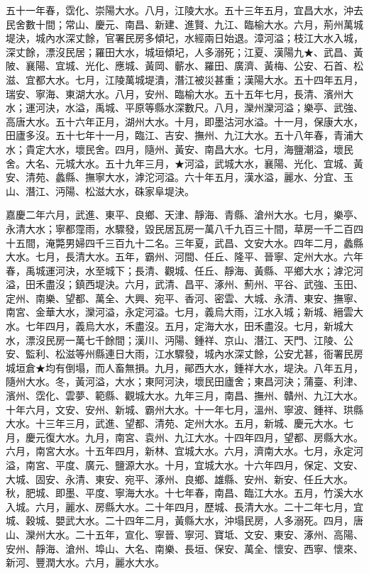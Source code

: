\begin{pinyinscope}
五十一年春，霑化、崇陽大水。八月，江陵大水。五十三年五月，宜昌大水，沖去民舍數十間；常山、慶元、南昌、新建、進賢、九江、臨榆大水。六月，荊州萬城堤決，城內水深丈餘，官署民房多傾圮，水經兩日始退。漳河溢；枝江大水入城，深丈餘，漂沒民居；羅田大水，城垣傾圮，人多溺死；江夏、漢陽九★、武昌、黃陂、襄陽、宜城、光化、應城、黃岡、蘄水、羅田、廣濟、黃梅、公安、石首、松滋、宜都大水。七月，江陵萬城堤潰，潛江被災甚重；漢陽大水。五十四年五月，瑞安、寧海、東湖大水。八月，安州、臨榆大水。五十五年七月，長清、濱州大水；運河決，水溢，禹城、平原等縣水深數尺。八月，灤州灤河溢；樂亭、武強、高唐大水。五十六年正月，湖州大水。十月，即墨沽河水溢。十一月，保康大水，田廬多沒。五十七年十一月，臨江、吉安、撫州、九江大水。五十八年春，青浦大水；貴定大水，壞民舍。四月，隨州、黃安、南昌大水。七月，海鹽潮溢，壞民舍。大名、元城大水。五十九年三月，★河溢，武城大水，襄陽、光化、宜城、黃安、清苑、蠡縣、撫寧大水，滹沱河溢。六十年五月，漢水溢，麗水、分宜、玉山、潛江、沔陽、松滋大水，硃家阜堤決。

嘉慶二年六月，武進、東平、良鄉、天津、靜海、青縣、滄州大水。七月，樂亭、永清大水；寧都霪雨，水驟發，毀民居瓦房一萬八千九百三十間，草房一千二百四十五間，淹斃男婦四千三百九十二名。三年夏，武昌、文安大水。四年二月，蠡縣大水。七月，長清大水。五年，霸州、河間、任丘、隆平、晉寧、定州大水。六年春，禹城運河決，水至城下；長清、觀城、任丘、靜海、黃縣、平鄉大水；滹沱河溢，田禾盡沒；鎮西堤決。六月，武清、昌平、涿州、薊州、平谷、武強、玉田、定州、南樂、望都、萬全、大興、宛平、香河、密雲、大城、永清、東安、撫寧、南宮、金華大水，灤河溢，永定河溢。七月，義烏大雨，江水入城；新城、縉雲大水。七年四月，義烏大水，禾盡沒。五月，定海大水，田禾盡沒。七月，新城大水，漂沒民房一萬七千餘間；漢川、沔陽、鍾祥、京山、潛江、天門、江陵、公安、監利、松滋等州縣連日大雨，江水驟發，城內水深丈餘，公安尤甚，衙署民房城垣倉★均有倒塌，而人畜無損。九月，鄖西大水，鍾祥大水，堤決。八年五月，隨州大水。冬，黃河溢，大水；東阿河決，壞民田廬舍；東昌河決；蒲臺、利津、濱州、霑化、雲夢、範縣、觀城大水。九年三月，南昌、撫州、贛州、九江大水。十年六月，文安、安州、新城、霸州大水。十一年七月，溫州、寧波、鍾祥、珙縣大水。十三年三月，武進、望都、清苑、定州大水。五月，新城、慶元大水。七月，慶元復大水。九月，南宮、袁州、九江大水。十四年四月，望都、房縣大水。六月，南宮大水。十五年四月，新林、宜城大水。六月，濟南大水。七月，永定河溢，南宮、平度、廣元、鹽源大水。十月，宜城大水。十六年四月，保定、文安、大城、固安、永清、東安、宛平、涿州、良鄉、雄縣、安州、新安、任丘大水。秋，肥城、即墨、平度、寧海大水。十七年春，南昌、臨江大水。五月，竹溪大水入城。六月，麗水、房縣大水。二十年四月，歷城、長清大水。二十二年七月，宜城、穀城、嬰武大水。二十四年二月，黃縣大水，沖塌民房，人多溺死。四月，唐山、灤州大水。二十五年，宣化、寧晉、寧河、寶坻、文安、東安、涿州、高陽、安州、靜海、滄州、埠山、大名、南樂、長垣、保安、萬全、懷安、西寧、懷來、新河、豐潤大水。六月，麗水大水。


\end{pinyinscope}
